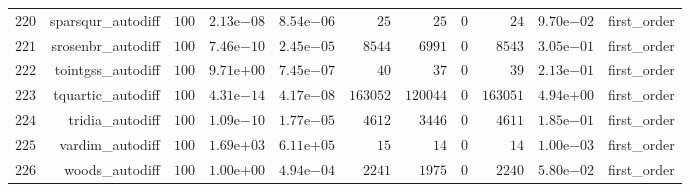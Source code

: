 \documentclass[varwidth=20cm,crop=true]{standalone}
\begin{document}
\begin{longtable}{rrrrrrrrrrr}
  \(   220\) & sparsqur\_autodiff & \(   100\) & \( 2.13\)e\(-08\) & \( 8.54\)e\(-06\) & \(    25\) & \(    25\) & \(     0\) & \(    24\) & \( 9.70\)e\(-02\) & first\_order \\
  \(   221\) & srosenbr\_autodiff & \(   100\) & \( 7.46\)e\(-10\) & \( 2.45\)e\(-05\) & \(  8544\) & \(  6991\) & \(     0\) & \(  8543\) & \( 3.05\)e\(-01\) & first\_order \\
  \(   222\) & tointgss\_autodiff & \(   100\) & \( 9.71\)e\(+00\) & \( 7.45\)e\(-07\) & \(    40\) & \(    37\) & \(     0\) & \(    39\) & \( 2.13\)e\(-01\) & first\_order \\
  \(   223\) & tquartic\_autodiff & \(   100\) & \( 4.31\)e\(-14\) & \( 4.17\)e\(-08\) & \(163052\) & \(120044\) & \(     0\) & \(163051\) & \( 4.94\)e\(+00\) & first\_order \\
  \(   224\) & tridia\_autodiff & \(   100\) & \( 1.09\)e\(-10\) & \( 1.77\)e\(-05\) & \(  4612\) & \(  3446\) & \(     0\) & \(  4611\) & \( 1.85\)e\(-01\) & first\_order \\
  \(   225\) & vardim\_autodiff & \(   100\) & \( 1.69\)e\(+03\) & \( 6.11\)e\(+05\) & \(    15\) & \(    14\) & \(     0\) & \(    14\) & \( 1.00\)e\(-03\) & first\_order \\
  \(   226\) & woods\_autodiff & \(   100\) & \( 1.00\)e\(+00\) & \( 4.94\)e\(-04\) & \(  2241\) & \(  1975\) & \(     0\) & \(  2240\) & \( 5.80\)e\(-02\) & first\_order \\\hline
\end{longtable}
\end{document}
